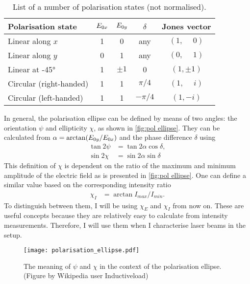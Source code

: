 \begin{table}
	\centering
	\begin{tabular}{lcccc}
		\toprule
		Polarisation state      & $ E_{0x} $ & $ E_{0y} $ & $ \delta $ &     Jones vector      \\ \midrule
		Linear along $ x $      &    1     &    0     &    any     & $ (1, \phantom{-}0) $ \\
		Linear along $ y $      &    0     &    1     &    any     & $ (0, \phantom{-}1) $ \\
		Linear at \ang{+-45}    &    1     & $ \pm1 $ &     0      &     $ (1, \pm1) $     \\
		Circular (right-handed) &    1     &    1     & $ \pi/4 $  & $ (1, \phantom{-}i) $ \\
		Circular (left-handed)  &    1     &    1     & $ -\pi/4 $ &      $ (1, -i) $      \\ \bottomrule
	\end{tabular}
	\caption{List of a number of polarisation states (not normalised).}
	\label{tab:polarisation states}
\end{table}


In general, the polarisation ellipse can be defined by means of two angles: the orientation $ \psi $ and ellipticity $ \chi $, as shown in \autoref{fig:pol ellipse}. They can be calculated from $ \alpha = \arctan(E_{0y}/E_{0x}) $ and the phase difference $ \delta $ using
\begin{align}
	\tan 2\psi &= \tan 2\alpha \cos \delta,\\
	\sin 2\chi &= \sin 2\alpha \sin \delta
\end{align}
This definition of $ \chi $ is dependent on the ratio of the maximum and minimum amplitude of the electric field as is presented in \autoref{fig:pol ellipse}. One can define a similar value based on the corresponding intensity ratio
\begin{align}
	\chi_I &= \arctan {I_\mathit{max}}/{I_\mathit{min}}.
\end{align}
To distinguish between them, I will be using $ \chi_E $ and $ \chi_I $ from now on. These are useful concepts because they are relatively easy to calculate from intensity measurements. Therefore, I will use them when I characterise laser beams in the setup.

\begin{figure}
	\centering
	\texttt{[image: polarisation\_ellipse.pdf]}
	\caption{The meaning of $ \psi $ and $ \chi $ in the context of the polarisation ellipse. (Figure by Wikipedia user Inductiveload)}
	\label{fig:pol ellipse}
\end{figure}

